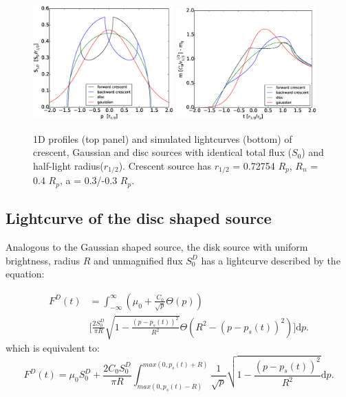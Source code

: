 \documentclass[usenatbib]{mn2e}
\begin{document}
\begin{figure}
\centering
    \includegraphics[width = 0.48\textwidth]{figures/S1D_all.eps}
    \includegraphics[width = 0.48\textwidth]{figures/4source_magnification.eps}
\caption{\label{fig:lightcurve_gauss} 1D profiles (top panel) and simulated lightcurves (bottom) of crescent, Gaussian and disc sources with identical total flux ($S_0$) and half-light radius($r_{1/2}$). Crescent source has $r_{1/2}$ = 0.72754 $R_p$, $R_n$ = 0.4 $R_p$, a = 0.3/-0.3 $R_p$. }
\end{figure}


\subsection{Lightcurve of the disc shaped source}

Analogous to the Gaussian shaped source, the disk source with uniform brightness, radius $R$ and 
unmagnified flux $S_0^D$ has a lightcurve described by the equation:

\begin{equation}
\begin{aligned}
 F^D(t) &= \int_{-\infty}^\infty  \left( \mu_0 + \frac{C_0}{\sqrt{p}} \Theta \left( p \right) \right) \\
    & \bigg[ \frac{2 S_0^D}{ \pi R} \sqrt{1 - \frac{\left( p-p_s(t) \right)^2}{R^2}}  \Theta \left(R^2 - \left(p-p_s(t) \right)^2 \right) \bigg] \mathrm{d}p.
\end{aligned}
\end{equation}
which is equivalent to:
\begin{equation}
 F^D(t) = \mu_0 S_0^D + \frac{2 C_0 S_0^D}{\pi R} \int_{max(0, p_s(t) - R)}^{max(0, p_s(t) + R)} \frac{1}{\sqrt{p}} \sqrt{1 - \frac{\left( p-p_s(t) \right)^2}{R^2}} \mathrm{d}p.
\end{equation}
\end{document}
